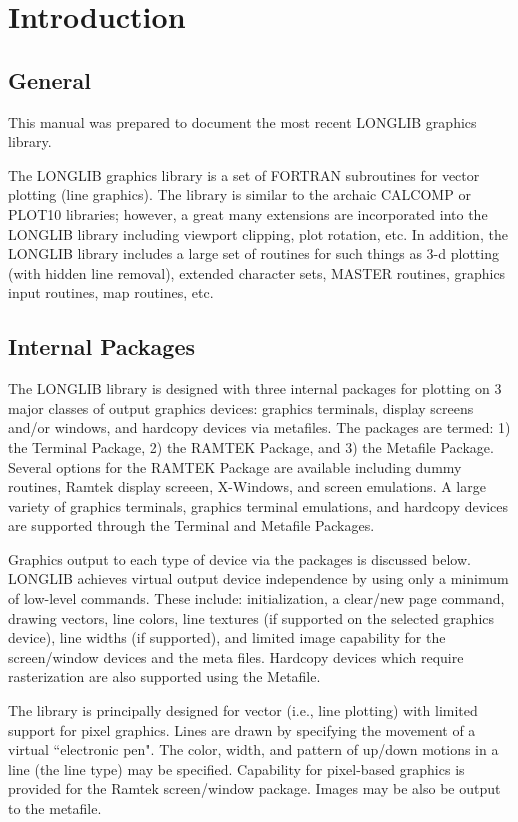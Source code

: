 \documentclass[11pt]{report}
\begin{document}
\chapter{Introduction}


\section{General}

This manual was prepared to document the most recent LONGLIB graphics
library.

The LONGLIB graphics library is a set of FORTRAN subroutines for
vector plotting (line graphics).  The library is similar to the
archaic CALCOMP or PLOT10 libraries; however, a great many extensions
are incorporated into the LONGLIB library including viewport clipping,
plot rotation, etc. In addition, the LONGLIB library includes a large
set of routines for such things as 3-d plotting (with hidden line
removal), extended character sets, MASTER routines, graphics input
routines, map routines, etc.


\section{Internal Packages}
The LONGLIB library is designed with three internal packages for
plotting on 3 major classes of output graphics devices: graphics
terminals, display screens and/or windows, and hardcopy devices via
metafiles.  The packages are termed: 1) the Terminal Package, 2) the
RAMTEK Package, and 3) the Metafile Package.  Several options for the
RAMTEK Package are available including dummy routines, Ramtek display
screeen, X-Windows, and screen emulations.  A large variety of
graphics terminals, graphics terminal emulations, and hardcopy devices
are supported through the Terminal and Metafile Packages.

Graphics output to each type of device via the packages is discussed
below.  LONGLIB achieves virtual output device independence by using
only a minimum of low-level commands.  These include: initialization,
a clear/new page command, drawing vectors, line colors, line textures
(if supported on the selected graphics device), line widths (if
supported), and limited image capability for the screen/window devices
and the meta files.  Hardcopy devices which require rasterization are
also supported using the Metafile.

The library is principally designed for vector (i.e., line plotting)
with limited support for pixel graphics.  Lines are drawn by
specifying the movement of a virtual ``electronic pen".  The color,
width, and pattern of up/down motions in a line (the line type) may be
specified.  Capability for pixel-based graphics is provided for the
Ramtek screen/window package.  Images may be also be output to the
metafile.
\end{document}
